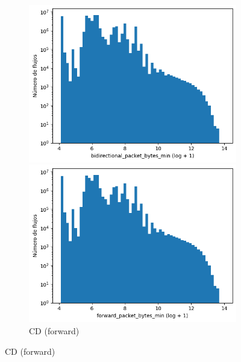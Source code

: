 \begin{figure}[H]
    \centering
    \hfill
    \begin{subfigure}[b]{0.26\textwidth}
        \centering
        \includegraphics[width=\textwidth]{media/packet_pincer_cicddos/bidirectional_packet_bytes_min_log_x_log_y.png}
        \caption{CD (bidir.)}
        \includegraphics[width=\textwidth]{media/packet_pincer_cicddos/forward_packet_bytes_min_log_x_log_y.png}
        \caption{CD (forward)}

\end{subfigure}
\end{figure}
